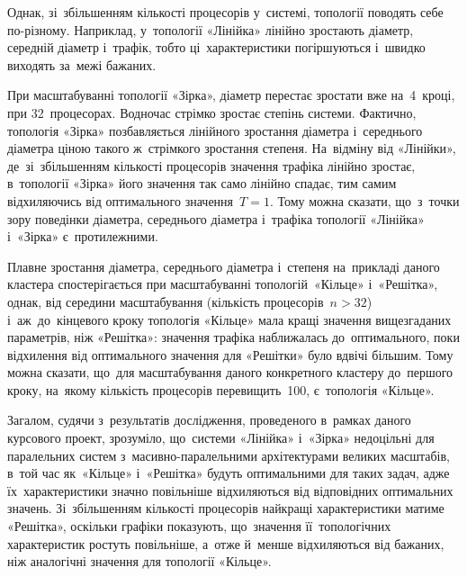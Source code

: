 \documentclass[
	a4paper,
	oneside,
	BCOR = 10mm,
	DIV = 12,
	12pt,
	headings = normal,
]{scrartcl}
\begin{document}
		Однак, зі~збільшенням кількості процесорів у~системі, топології поводять себе по-різному. Наприклад, у~топології «Лінійка» лінійно зростають діаметр, середній діаметр і~трафік, тобто ці~характеристики погіршуються і~швидко виходять за~межі бажаних. 

		При масштабуванні топології «Зірка», діаметр перестає зростати вже на~4~кроці, при 32~процесорах. Водночас стрімко зростає степінь системи. Фактично, топологія «Зірка» позбавляється лінійного зростання діаметра і~середнього діаметра ціною такого ж~стрімкого зростання степеня. На~відміну від «Лінійки», де~зі~збільшенням кількості процесорів значення трафіка лінійно зростає, в~топології «Зірка» його значення так само лінійно спадає, тим самим відхиляючись від оптимального значення~$T = 1$. Тому можна сказати, що~з~точки зору поведінки діаметра, середнього діаметра і~трафіка топології «Лінійка» і~«Зірка» є~протилежними.

		Плавне зростання діаметра, середнього діаметра і~степеня на~прикладі даного кластера спостерігається при масштабуванні топологій~«Кільце» і~«Решітка», однак, від середини масштабування (кількість процесорів~$n > 32$) і~аж~до~кінцевого кроку топологія «Кільце» мала кращі значення вищезгаданих параметрів, ніж «Решітка»: значення трафіка наближалась до~оптимального, поки відхилення від оптимального значення для «Решітки» було вдвічі більшим. Тому можна сказати, що~для масштабування даного конкретного кластеру до~першого кроку, на~якому кількість процесорів перевищить~100, є~топологія «Кільце».

		Загалом, судячи з~результатів дослідження, проведеного в~рамках даного курсового проект, зрозуміло, що~системи «Лінійка» і~«Зірка» недоцільні для паралельних систем з~масивно-паралельними архітектурами великих масштабів, в~той час як~«Кільце» і~«Решітка» будуть оптимальними для таких задач, адже їх~характеристики значно повільніше відхиляються від відповідних оптимальних значень. Зі~збільшенням кількості процесорів найкращі характеристики матиме «Решітка», оскільки графіки показують, що~значення її~топологічних характеристик ростуть повільніше, а~отже й~менше відхиляються від бажаних, ніж аналогічні значення для топології «Кільце».
\end{document}
